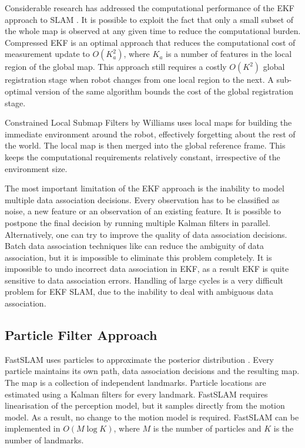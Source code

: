 Considerable research has addressed the computational performance of
the EKF approach to SLAM \cite{williams:acra2001, williams2001esa,
  knight2001tct, guivant01,guivant02, tim_bailey,
  uhlmann97nondivergent,
  tardos02:_mappin_local_indoor_envir_using_sonar_data}.  
It is possible to exploit the fact that only a small subset of the
whole map is observed at any given time to reduce the computational
burden.  Compressed EKF \cite{guivant02} is an optimal approach that
reduces the computational cost of measurement update to $O(K_a^2)$,
where $K_a$ is a number of features in the local region of the global
map.  This approach still requires a costly $O(K^2)$ global
registration stage when robot changes from one local region to the
next. A sub-optimal version of the same algorithm bounds the cost of
the global registration stage.

Constrained Local Submap Filters \cite{williams:acra2001} by Williams
uses local maps for building the immediate environment around the
robot, effectively forgetting about the rest of the world. The local
map is then merged into the global reference frame. This keeps the
computational requirements relatively constant, irrespective of the
environment size. 

The most important limitation of the EKF approach is the inability to
model multiple data association decisions. Every observation has to be
classified as noise, a new feature or an observation of an existing
feature.  It is possible to postpone the final decision by running
multiple Kalman filters in parallel. Alternatively, one can try to
improve the quality of data association decisions. Batch data
association techniques like
\cite{neira01:_data_assoc_stoch_mappin_using,
  tardos02:_mappin_local_indoor_envir_using_sonar_data} can reduce the
ambiguity of data association, but it is impossible to eliminate this
problem completely. It is impossible to undo incorrect data
association in EKF, as a result EKF is quite sensitive to data
association errors. Handling of large cycles is a very difficult
problem for EKF SLAM, due to the inability to deal with ambiguous data
association.


\subsection{Particle Filter Approach}
FastSLAM uses particles to approximate the posterior distribution
\cite{fastslam}. Every particle maintains its own path, data
association decisions and the resulting map. The map is a collection
of independent landmarks. Particle locations are estimated using a
Kalman filters for every landmark. FastSLAM requires linearisation of
the perception model, but it samples directly from the motion model.
As a result, no change to the motion model is required. FastSLAM can
be implemented in $O(M\log K)$, where $M$ is the number of particles
and $K$ is the number of landmarks.

